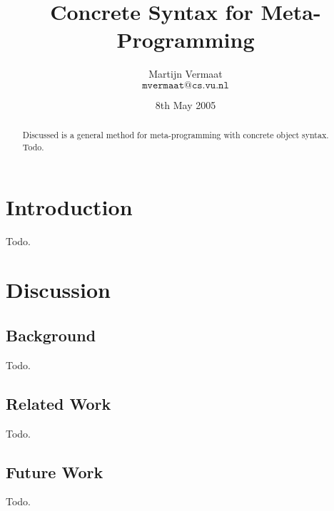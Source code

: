 \documentclass[a4paper,11pt]{article}
\title{Concrete Syntax for Meta-Programming}
\author{Martijn Vermaat\\
$\texttt{mvermaat@cs.vu.nl}$}
\date{8th May 2005}
\begin{document}
\maketitle


\begin{abstract}
Discussed is a general method for meta-programming with concrete object
syntax. Todo.
\end{abstract}


\section{Introduction}

Todo.


\section{Discussion}


\subsection{Background}

Todo.


\subsection{Related Work}

Todo.


\subsection{Future Work}

Todo.
\end{document}
